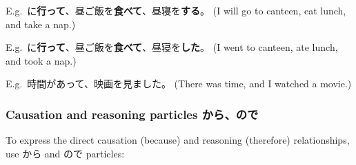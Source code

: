 \documentclass[../nihongo-gakushuu-kyouzai.tex]{subfiles}
\begin{document}
E.g.\ に\textbf{行って}、昼ご飯を\textbf{食べて}、昼寝を\textbf{する}。 (I will go to canteen, eat lunch, and take a nap.)

E.g.\ に\textbf{行って}、昼ご飯を\textbf{食べて}、昼寝を\textbf{した}。 (I went to canteen, ate lunch, and took a nap.)

E.g.\ 時間があって、映画を見ました。 (There was time, and I watched a movie.)

\subsubsection{Causation and reasoning particles から、ので} \label{sec:causation-reasoning-particles}
To express the direct causation (because) and reasoning (therefore) relationships, use から and ので particles:
\end{document}
